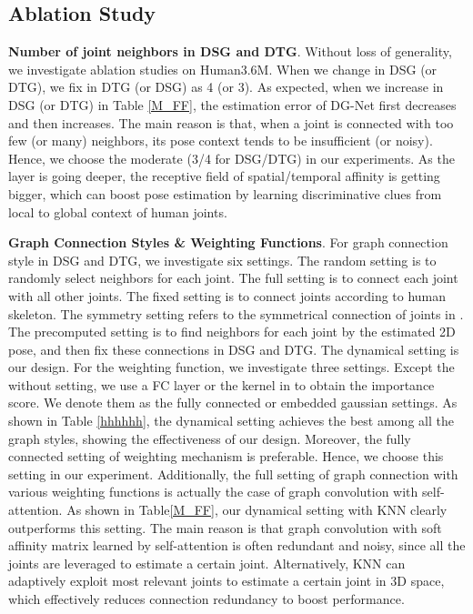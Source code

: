\documentclass[journal]{IEEEtran}
\begin{document}
\subsection{Ablation Study}


\textbf{Number of joint neighbors  in DSG and DTG}.
Without loss of generality,
we investigate ablation studies on Human3.6M.
When we change  in DSG (or DTG),
we fix  in DTG (or DSG) as 4 (or 3).
As expected,
when we increase  in DSG (or DTG) in Table \ref{M_FF},
the estimation error of DG-Net first decreases and then increases.
The main reason is that,
when a joint is connected with too few (or many) neighbors,
its pose context tends to be insufficient (or noisy).
Hence,
we choose the moderate  (3/4 for DSG/DTG) in our experiments.
As the layer is going deeper,
the receptive field of spatial/temporal affinity is getting bigger,
which can boost pose estimation by learning discriminative clues from local to global context of human joints.



\textbf{Graph Connection Styles \& Weighting Functions}.
For graph connection style in DSG and DTG,
we investigate six settings.
The random setting is to randomly select  neighbors for each joint.
The full setting is to connect each joint with all other joints.
The fixed setting is to connect joints according to human skeleton.
The symmetry setting refers to the symmetrical connection of joints in \cite{rnnpose}.
The precomputed setting is to find  neighbors for each joint by the estimated 2D pose,
and then fix these connections in DSG and DTG.
The dynamical setting is our design.
For the weighting function,
we investigate three settings.
Except the without setting,
we use a FC layer or the kernel in \cite{nonlocal} to obtain the importance score.
We denote them as the fully connected or embedded gaussian settings.
As shown in Table \ref{hhhhhh},
the dynamical setting achieves the best among all the graph styles,
showing the effectiveness of our design.
Moreover,
the fully connected setting of weighting mechanism is preferable.
Hence,
we choose this setting in our experiment.
Additionally,
the full setting of graph connection with various weighting functions is actually the case of graph convolution with self-attention.
As shown in Table\ref{M_FF},
our dynamical setting with KNN clearly outperforms this setting.
The main reason is that graph convolution with soft affinity matrix learned by self-attention is often redundant and noisy,
since all the joints are leveraged to estimate a certain joint.
Alternatively,
KNN can adaptively exploit most relevant joints to estimate a certain joint in 3D space,
which effectively reduces connection redundancy to boost performance.
\end{document}
